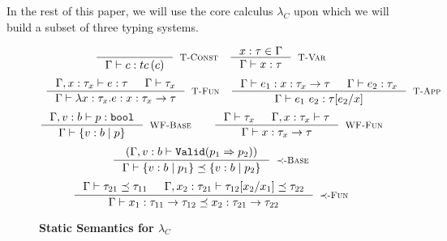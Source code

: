 In the rest of this paper, we will use the core calculus $\lambda_C$
upon which we will build a subset of three typing systems\cite{ LiquidPLDI08, Greenberg12, Vazou13}.


\begin{figure}[ht!]
\medskip {}
\begin{comment}
$$\begin{array}{cc}

\inference
  {  \hastype{\Gamma}{e}{\tau_2} && \isSubType{\Gamma}{\tau_2}{\tau_1} 
  && \isWellFormed{\Gamma}{\tau_1}
  }
  {\hastype{\Gamma}{e}{\tau_1}}
  [\tsub]
\end{array}$$
\end{comment}
$$\begin{array}{cc}
\inference
  {}
  {\hastype{\Gamma}{c}{\tc{c}}}
  [\tconst]
&
\inference
  {x:\tau \in \Gamma}
  {\hastype{\Gamma}{x}{\tau}} 
  [\tvariable]
\end{array}$$
$$\begin{array}{cc}
\inference
  {\hastype{\Gamma, x:\tau_x}{e}{\tau} &&     
  \isWellFormed{\Gamma}{\tau_x}
  }
  {\hastype{\Gamma}{\efunt{x}{\tau_x}{e}}{\tfun{x}{\tau_x}{\tau}}}
  [\tfunction]
&
\inference
  {\hastype{\Gamma}{e_1}{\tfun{x}{\tau_x}{\tau}} &&
   \hastype{\Gamma}{e_2}{\tau_x}
  }
  {\hastype{\Gamma}{\eapp{e_1}{e_2}}{\tau[e_2/x]}} 
  [\tapp]
\end{array}$$
$$\inference
    {\hastype{\Gamma, v:b}{p}{\tbbool}}
    {\isWellFormed{\Gamma}{\tref{b}{p}}}
    [\wtBase]
\qquad
\inference
    {
    \isWellFormed{\Gamma}{\tau_x} &&
	\isWellFormed{\Gamma, x:\tau_x}{\tau}
    }
    {\isWellFormed{\Gamma}{\tfun{x}{\tau_x}{\tau}}}
    [\wtFun]
$$
\medskip {}
$$
\inference
   {(\Gamma, v:b \vdash \texttt{Valid}(p_1 \Rightarrow p_2))}
   {\isSubType{\Gamma}{\tref{b}{p_1}}{\tref{b}{p_2}}}
   [\tsubBase]
$$
$$
\inference
   {\isSubType{\Gamma}{\tau_{21}}{\tau_{11}} &
	\isSubType{\Gamma, x_2:{\tau_{21}}}{\SUBST{\tau_{12}}{x_1}{x_2}}{\tau_{22}}	
   }
   {\isSubType{\Gamma}
	  {\tfun{x_1}{\tau_{11}}{\tau_{12}}}
	  {\tfun{x_2}{\tau_{21}}{\tau_{22}}}
}[\tsubFun]
$$
\caption{\textbf{Static Semantics for $\lambda_C$}}
\label{fig:corerules}
\end{figure}